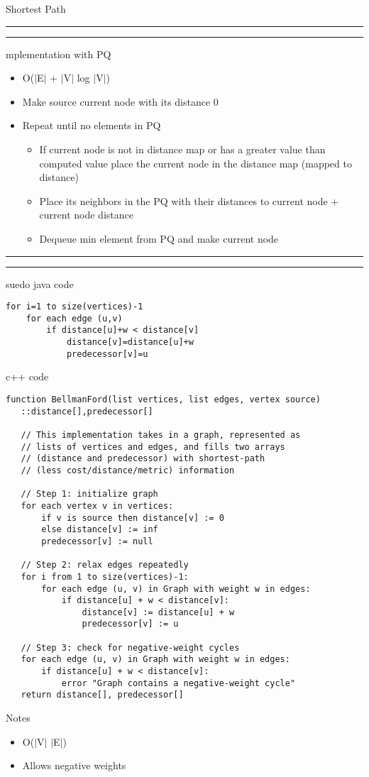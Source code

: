 \documentclass[11pt]{article}
\newcommand{\question}[2] {\vspace{.25in} \hrule\vspace{0.5em}
\noindent{\bf #1: #2} \vspace{0.5em}
\hrule \vspace{.10in}}
\begin{document}
\medskip                        %

\thispagestyle{plain}
\begin{center}                  %
{\Large Shortest Path} \\
\end{center}

\question{Dijkstras}

Implementation with PQ

\begin{itemize}
\item O($\mid$E$\mid$ + $\mid$V$\mid$ log $\mid$V$\mid$)
\item Make source current node with its distance 0
\item Repeat until no elements in PQ
\begin{itemize}
\item If current node is not in distance map or has a greater value than computed value place the current node in the distance map (mapped to distance)
\item Place its neighbors in the PQ with their distances to current node + current node distance
\item Dequeue min element from PQ and make current node
\end{itemize}
\end{itemize}

\question{Bellman Ford}

psuedo java code

\begin{lstlisting}
for i=1 to size(vertices)-1
	for each edge (u,v)
		if distance[u]+w < distance[v]
			distance[v]=distance[u]+w
			predecessor[v]=u
\end{lstlisting}

c++ code

\begin{lstlisting}
function BellmanFord(list vertices, list edges, vertex source)
   ::distance[],predecessor[]

   // This implementation takes in a graph, represented as
   // lists of vertices and edges, and fills two arrays
   // (distance and predecessor) with shortest-path
   // (less cost/distance/metric) information

   // Step 1: initialize graph
   for each vertex v in vertices:
       if v is source then distance[v] := 0
       else distance[v] := inf
       predecessor[v] := null

   // Step 2: relax edges repeatedly
   for i from 1 to size(vertices)-1:
       for each edge (u, v) in Graph with weight w in edges:
           if distance[u] + w < distance[v]:
               distance[v] := distance[u] + w
               predecessor[v] := u

   // Step 3: check for negative-weight cycles
   for each edge (u, v) in Graph with weight w in edges:
       if distance[u] + w < distance[v]:
           error "Graph contains a negative-weight cycle"
   return distance[], predecessor[]
\end{lstlisting}

Notes

\begin{itemize}
\item O($\mid$V$\mid$ $\mid$E$\mid$)
\item Allows negative weights
\end{itemize}
\end{document}
